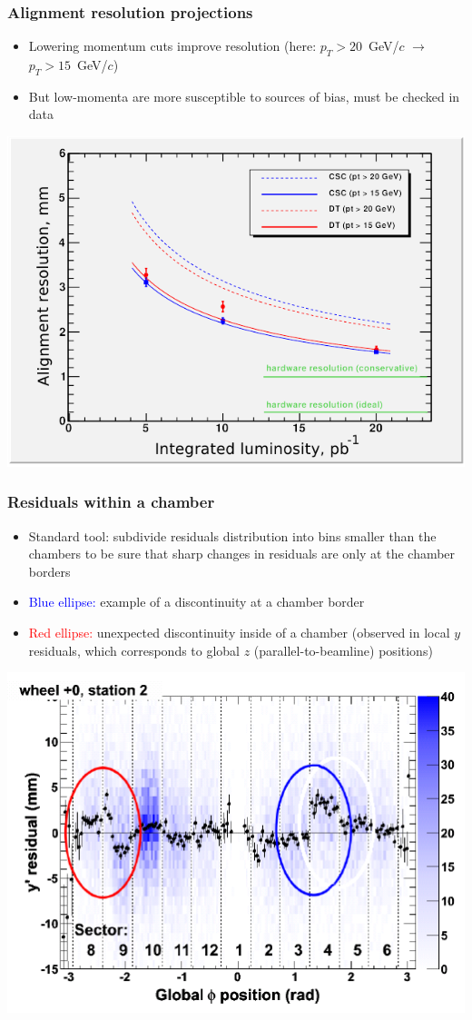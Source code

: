 \documentclass[compress]{beamer}
\begin{document}
\begin{frame}
\frametitle{Alignment resolution projections}
\begin{itemize}
\item Lowering momentum cuts improve resolution (here: $p_T > 20$~GeV/$c$ $\to$ $p_T > 15$~GeV/$c$)
\item But low-momenta are more susceptible to sources of bias, must be checked in data
\end{itemize}
\begin{center}
\includegraphics[width=0.75\linewidth]{lowercut.png}
\end{center}
\end{frame}

\begin{frame}
\frametitle{Residuals within a chamber}
\begin{itemize}
\item Standard tool: subdivide residuals distribution into bins
  smaller than the chambers to be sure that sharp changes in residuals
  are only at the chamber borders
\item \textcolor{blue}{Blue ellipse:} example of a discontinuity at a chamber border
\item \textcolor{red}{Red ellipse:} unexpected discontinuity inside of a chamber {\scriptsize (observed in local $y$ residuals, which corresponds to global $z$ (parallel-to-beamline) positions)}
\end{itemize}
\begin{center}
\includegraphics[width=0.65\linewidth]{localyplot.png}
\end{center}
\end{frame}
\end{document}
